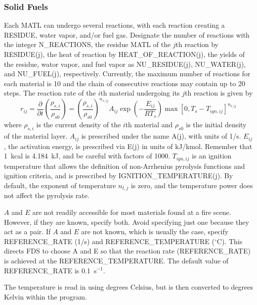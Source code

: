 \documentclass[11pt]{book}
\newcommand{\dod}[2]{\frac{\partial #1}{\partial #2}}
\newcommand{\be}{\begin{equation}}
\newcommand{\ee}{\end{equation}}
\begin{document}
\subsubsection{Solid Fuels}

Each {\ct MATL} can undergo several reactions, with each
reaction creating a {\ct RESIDUE}, water vapor, and/or fuel
gas. Designate the number of reactions with the integer {\ct
N\_REACTIONS}, the residue {\ct MATL} of the $j$th reaction by {\ct
RESIDUE(j)}, the heat of reaction by {\ct HEAT\_OF\_REACTION(j)}, the
yields of the residue, wator vapor, and fuel vapor as
{\ct NU\_RESIDUE(j)}, {\ct NU\_WATER(j)}, and {\ct NU\_FUEL(j)},
respectively. Currently, the maximum number of reactions for each
material is 10 and the chain of consecutive reactions may contain up
to 20 steps. The reaction rate of the $i$th material undergoing its
$j$th reaction is given by
\be
  r_{ij} =
  \dod{ }{t} \left( \frac{\rho_{s,i}}{\rho_{s0}} \right) =
  \left(\frac{\rho_{s,i}}{\rho_{s0}} \right)^{n_{s,ij}}
  A_{ij} \exp\left(-\frac{E_{ij}}{RT_s} \right)
  \max\left[0,T_s-T_{ign,ij}\right]^{n_{t,ij}}  \label{rr}
\ee
where $\rho_{s,i}$ is the current density of the $i$th material and
$\rho_{s0}$ is the initial density of the material layer.
$A_{ij}$ is prescribed under the name {\ct A(j)}, with units of
1/s. $E_{ij}$, the activation energy, is prescribed via {\ct E(j)} in
units of kJ/kmol. Remember that 1~kcal is 4.184~kJ, and be careful
with factors of 1000. $T_{ign,ij}$ is an ignition temperature that
allows the definition of non-Arrhenius pyrolysis functions and
ignition criteria, and is prescribed by {\ct IGNITION\_TEMPERATURE(j)}.
By default, the exponent of temperature $n_{t,j}$ is zero, and the
temperature power does not affect the pyrolysis rate.

$A$ and $E$ are not readily accessible for most materials found at a
fire scene. However, if they are known, specify both. Avoid specifying
just one because they act as a pair.  If $A$ and $E$ are not known,
which is usually the case, specify {\ct REFERENCE\_RATE} (1/s) and
{\ct REFERENCE\_TEMPERATURE} ($^\circ$C). This directs FDS to choose
{\ct A} and {\ct E} so that the reaction rate ({\ct REFERENCE\_RATE})
is achieved at the {\ct REFERENCE\_TEMPERATURE}. The default value of {\ct
REFERENCE\_RATE} is 0.1~s$^{-1}$.
\begin{warning}
\noindent
The temperature is read in using degrees Celsius, but is then converted to
degrees Kelvin within the program.
\end{warning}
\end{document}
